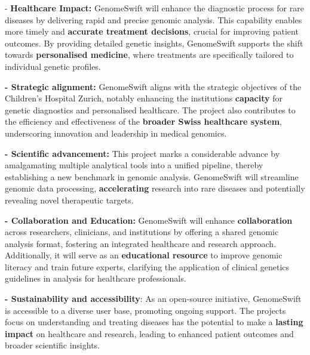 - \textbf{Healthcare Impact:} GenomeSwift will enhance the diagnostic
process for rare diseases by delivering rapid and precise genomic
analysis. This capability enables more timely and \textbf{accurate
treatment decisions}, crucial for improving patient outcomes. By
providing detailed genetic insights, GenomeSwift supports the shift
towards \textbf{personalised medicine}, where treatments are
specifically tailored to individual genetic profiles.

\textbf{- Strategic alignment:} GenomeSwift aligns with the strategic
objectives of the Children's Hospital Zurich, notably enhancing the
institution\textquotesingle s \textbf{capacity} for genetic diagnostics
and personalised healthcare. The project also contributes to the
efficiency and effectiveness of the \textbf{broader Swiss healthcare
system}, underscoring innovation and leadership in medical genomics.

\textbf{- Scientific advancement:} This project marks a considerable
advance by amalgamating multiple analytical tools into a unified
pipeline, thereby establishing a new benchmark in genomic analysis.
GenomeSwift will streamline genomic data processing,
\textbf{accelerating} research into rare diseases and potentially
revealing novel therapeutic targets.

\textbf{- Collaboration and Education:} GenomeSwift will enhance
\textbf{collaboration} across researchers, clinicians, and institutions
by offering a shared genomic analysis format, fostering an integrated
healthcare and research approach. Additionally, it will serve as an
\textbf{educational resource} to improve genomic literacy and train
future experts, clarifying the application of clinical genetics
guidelines in analysis for healthcare professionals.

\textbf{- Sustainability and accessibility}: As an open-source
initiative, GenomeSwift is accessible to a diverse user base, promoting
ongoing support. The project\textquotesingle s focus on understanding
and treating diseases has the potential to make a \textbf{lasting
impact} on healthcare and research, leading to enhanced patient outcomes
and broader scientific insights.
